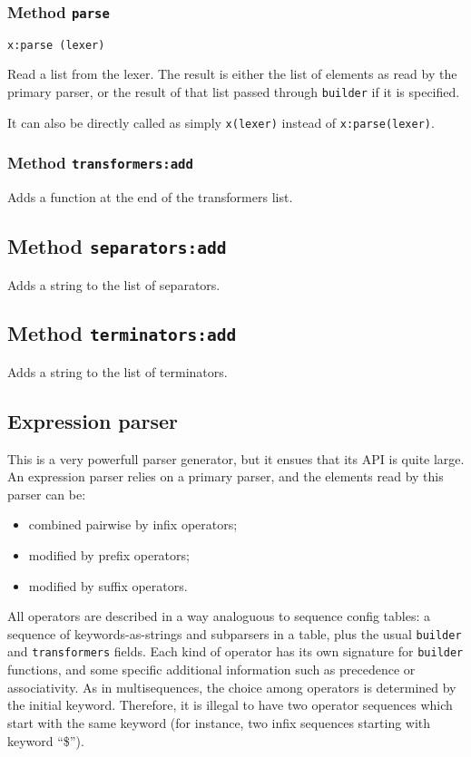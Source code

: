 \subsubsection{Method {\tt parse}}

\begin{verbatim}
x:parse (lexer)
\end{verbatim}

Read a list from the lexer. The result is either the list of elements
as read by the primary parser, or the result of that list passed
through \verb|builder| if it is specified.

It can also be directly called as simply \verb|x(lexer)| instead of
\verb|x:parse(lexer)|.

\subsubsection{Method {\tt transformers:add}}
Adds a function at the end of the transformers list.

\subsection{Method {\tt separators:add}}
Adds a string to the list of separators.

\subsection{Method {\tt terminators:add}}
Adds a string to the list of terminators.

\subsection{Expression parser}

This is a very powerfull parser generator, but it ensues that its API
is quite large. An expression parser relies on a primary parser, and
the elements read by this parser can be:
\begin{itemize}
\item combined pairwise by infix operators;
\item modified by prefix operators;
\item modified by suffix operators.
\end{itemize}

All operators are described in a way analoguous to sequence config
tables: a sequence of keywords-as-strings and subparsers in a table,
plus the usual \verb|builder| and \verb|transformers|
fields. Each kind of operator has its own signature for \verb|builder|
functions, and some specific additional information such as precedence
or associativity. As in multisequences, the choice among operators is
determined by the initial keyword. Therefore, it is illegal to have
two operator sequences which start with the same keyword (for
instance, two infix sequences starting with keyword ``\$'').

